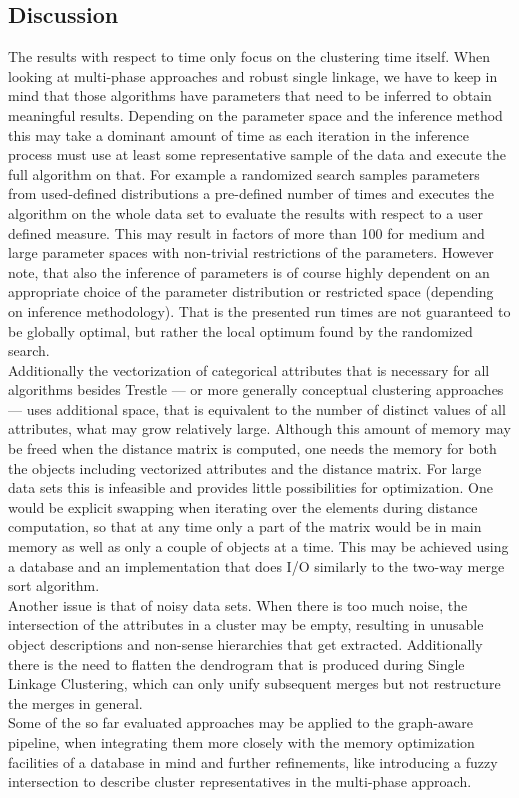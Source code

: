 \subsection{Discussion}\label{\positionnumber}
The results with respect to time only focus on the clustering time itself. When looking at multi-phase approaches and robust single linkage, we have to keep in mind that those algorithms have parameters that need to be inferred to obtain meaningful results. Depending on the parameter space and the inference method this may take a dominant amount of time as each iteration in the inference process must use at least some representative sample of the data and execute the full algorithm on that. For example a randomized search samples parameters from used-defined distributions a pre-defined number of times and executes the algorithm on the whole data set to evaluate the results with respect to a user defined measure. This may result in factors of more than 100 for medium and large parameter spaces with non-trivial restrictions of the parameters. However note, that also the inference of parameters is of course highly dependent on an appropriate choice of the parameter distribution or restricted space (depending on inference methodology). That is the presented run times are not guaranteed to be globally optimal, but rather the local optimum found by the randomized search. \\
Additionally the vectorization of categorical attributes that is necessary for all algorithms besides Trestle --- or more generally conceptual clustering approaches --- uses additional space, that is equivalent to the number of distinct values of all attributes, what may grow relatively large. Although this amount of memory may be freed when the distance matrix is computed, one needs the memory for both the objects including vectorized attributes and the distance matrix. For large data sets this is infeasible and provides little possibilities for optimization. One would be explicit swapping when iterating over the elements during distance computation, so that at any time only a part of the matrix would be in main memory as well as only a couple of objects at a time. This may be achieved using a database and an implementation that does I/O similarly to the two-way merge sort algorithm. \\
Another issue is that of noisy data sets. When there is too much noise, the intersection of the attributes in a cluster may be empty, resulting in unusable object descriptions and non-sense hierarchies that get extracted. Additionally there is the need to flatten the dendrogram that is produced during Single Linkage Clustering, which can only unify subsequent merges but not restructure the merges in general. \\
Some of the so far evaluated approaches may be applied to the graph-aware pipeline, when integrating them more closely with the memory optimization facilities of a database in mind and further refinements, like introducing a fuzzy intersection to describe cluster representatives in the multi-phase approach.
        

